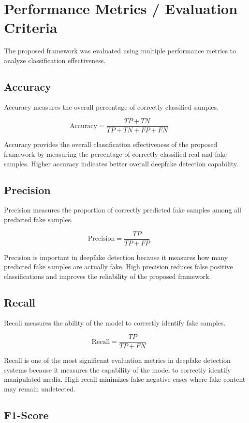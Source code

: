 \documentclass[12pt,a4paper]{report}
\begin{document}
\section{Performance Metrics / Evaluation Criteria}
The proposed framework was evaluated using multiple performance metrics to analyze classification effectiveness.

\subsection{Accuracy}

Accuracy measures the overall percentage of correctly classified samples.

\[
\text{Accuracy} = \frac{TP + TN}{TP + TN + FP + FN}
\qquad
\tag{3.1}
\]

Accuracy provides the overall classification effectiveness of the proposed framework by measuring the percentage of correctly classified real and fake samples. Higher accuracy indicates better overall deepfake detection capability.

\subsection{Precision}

Precision measures the proportion of correctly predicted fake samples among all predicted fake samples.

\[
\text{Precision} = \frac{TP}{TP + FP}
\qquad
\tag{3.2}
\]

Precision is important in deepfake detection because it measures how many predicted fake samples are actually fake. High precision reduces false positive classifications and improves the reliability of the proposed framework.

\subsection{Recall}

Recall measures the ability of the model to correctly identify fake samples.

\[
\text{Recall} = \frac{TP}{TP + FN}
\qquad
\tag{3.3}
\]

Recall is one of the most significant evaluation metrics in deepfake detection systems because it measures the capability of the model to correctly identify manipulated media. High recall minimizes false negative cases where fake content may remain undetected.

\subsection{F1-Score}
\end{document}
